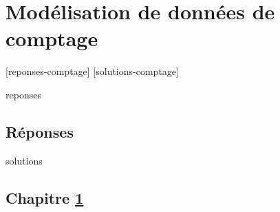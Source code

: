 \documentclass[letterpaper,10pt]{memoir}\usepackage[]{graphicx}\usepackage[]{color}
\newcounter{exercice}[chapter]
\begin{document}






\chapter{Modélisation de données de comptage}
\label{chap:comptage}

[reponses-comptage]
[solutions-comptage]

\begin{Filesave}{reponses}
\bigskip
\section*{Réponses}

\end{Filesave}

\begin{Filesave}{solutions}
\section*{Chapitre \ref{chap:comptage}}

\end{Filesave}
\end{document}
